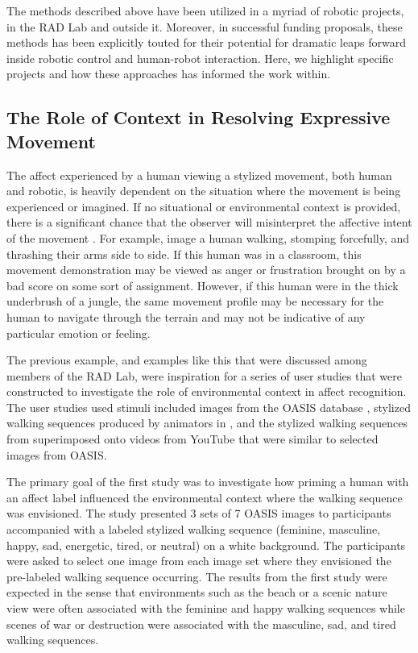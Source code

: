 \documentclass[arts,article,submit,moreauthors,pdftex,10pt,a4paper]{mdpi}
\begin{document}
The methods described above have been utilized in a myriad of robotic projects, in the RAD Lab and outside it.   Moreover, in successful funding proposals, these methods has been explicitly touted for their potential for dramatic leaps forward inside robotic control and human-robot interaction.  Here, we highlight specific projects and how these approaches has informed the work within. 

\subsection{The Role of Context in Resolving Expressive Movement}

The affect experienced by a human viewing a stylized movement, both human and robotic, is heavily dependent on the situation where the movement is being experienced or imagined. If no situational or environmental context is provided, there is a significant chance that the observer will misinterpret the affective intent of the movement \cite{zeng2009survey}. For example, image a human walking, stomping forcefully, and thrashing their arms side to side. If this human was in a classroom, this movement demonstration may be viewed as anger or frustration brought on by a bad score on some sort of assignment. However, if this human were in the thick underbrush of a jungle, the same movement profile may be necessary for the human to navigate through the terrain and may not be indicative of any particular emotion or feeling. 

The previous example, and examples like this that were discussed among members of the RAD Lab, were inspiration for a series of user studies that were constructed to investigate the role of environmental context in affect recognition. The user studies used stimuli included images from the OASIS database \cite{kurdi2017introducing}, stylized walking sequences produced by animators in \cite{etemad2016expert}, and the stylized walking sequences from \cite{etemad2016expert} superimposed onto videos from YouTube that were similar to selected images from OASIS. 

The primary goal of the first study was to investigate how priming a human with an affect label influenced the environmental context where the walking sequence was envisioned. The study presented 3 sets of 7 OASIS images to participants accompanied with a labeled stylized walking sequence (feminine, masculine, happy, sad, energetic, tired, or neutral) on a white background. The participants were asked to select one image from each image set where they envisioned the pre-labeled walking sequence occurring. The results from the first study were expected in the sense that environments such as the beach or a scenic nature view were often associated with the feminine and happy walking sequences while scenes of war or destruction were associated with the masculine, sad, and tired walking sequences.
\end{document}
